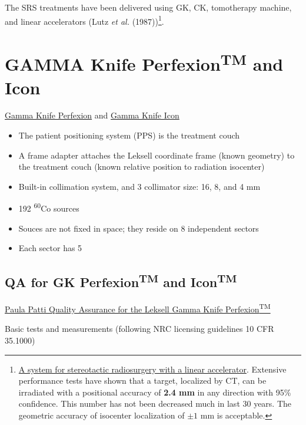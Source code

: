 \documentclass[]{book}
\providecommand{\tightlist}{%
  \setlength{\itemsep}{0pt}\setlength{\parskip}{0pt}}
\let\rmarkdownfootnote\footnote%
\def\footnote{\protect\rmarkdownfootnote}
\theoremstyle{definition}
\theoremstyle{definition}
\theoremstyle{definition}
\theoremstyle{remark}
\begin{document}
The SRS treatments have been delivered using GK, CK, tomotherapy
machine, and linear accelerators (Lutz \emph{et al.} (1987))\footnote{\href{https://www.ncbi.nlm.nih.gov/pubmed/3276655}{A
  system for stereotactic radiosurgery with a linear accelerator}.
  Extensive performance tests have shown that a target, localized by CT,
  can be irradiated with a positional accuracy of \textbf{2.4 mm} in any
  direction with 95\% confidence. This number has not been decreased
  much in last 30 years. The geometric accuracy of isocenter
  localization of \(\pm1\) mm is acceptable.}.

\section{\texorpdfstring{GAMMA Knife Perfexion\textsuperscript{TM} and
Icon}{GAMMA Knife PerfexionTM and Icon}}\label{gamma-knife-perfexiontm-and-icon}

\href{https://www.youtube.com/watch?v=90vD3cxc9m0}{Gamma Knife
Perfexion} and \href{https://www.youtube.com/watch?v=ZeFFwkxnoME}{Gamma
Knife Icon}

\begin{itemize}
\tightlist
\item
  The patient positioning system (PPS) is the treatment couch
\item
  A frame adapter attaches the Leksell coordinate frame (known geometry)
  to the treatment couch (known relative position to radiation
  isocenter)
\item
  Built-in collimation system, and 3 collimator size: 16, 8, and 4 mm
\item
  192 \textsuperscript{60}Co sources
\item
  Souces are not fixed in space; they reside on 8 independent sectors
\item
  Each sector has 5
\end{itemize}

\subsection{\texorpdfstring{QA for GK Perfexion\textsuperscript{TM} and
Icon\textsuperscript{TM}}{QA for GK PerfexionTM and IconTM}}\label{qa-for-gk-perfexiontm-and-icontm}

\href{https://vimeo.com/88176011}{Paula Patti Quality Assurance for the
Leksell Gamma Knife Perfexion\textsuperscript{TM}}

Basic tests and measurements (following NRC licensing guidelines 10 CFR
35.1000)
\end{document}
